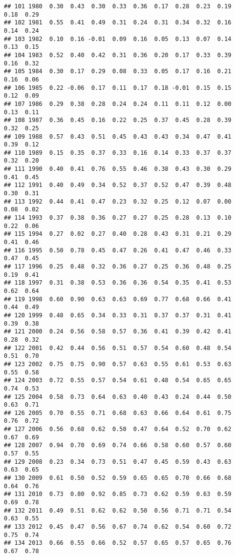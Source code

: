 \documentclass[]{article}
\begin{document}
\begin{verbatim}
## 101 1980  0.30  0.43  0.30  0.33  0.36  0.17  0.28  0.23  0.19  0.18  0.29
## 102 1981  0.55  0.41  0.49  0.31  0.24  0.31  0.34  0.32  0.16  0.14  0.24
## 103 1982  0.10  0.16 -0.01  0.09  0.16  0.05  0.13  0.07  0.14  0.13  0.15
## 104 1983  0.52  0.40  0.42  0.31  0.36  0.20  0.17  0.33  0.39  0.16  0.32
## 105 1984  0.30  0.17  0.29  0.08  0.33  0.05  0.17  0.16  0.21  0.16  0.06
## 106 1985  0.22 -0.06  0.17  0.11  0.17  0.18 -0.01  0.15  0.15  0.12  0.09
## 107 1986  0.29  0.38  0.28  0.24  0.24  0.11  0.11  0.12  0.00  0.13  0.11
## 108 1987  0.36  0.45  0.16  0.22  0.25  0.37  0.45  0.28  0.39  0.32  0.25
## 109 1988  0.57  0.43  0.51  0.45  0.43  0.43  0.34  0.47  0.41  0.39  0.12
## 110 1989  0.15  0.35  0.37  0.33  0.16  0.14  0.33  0.37  0.37  0.32  0.20
## 111 1990  0.40  0.41  0.76  0.55  0.46  0.38  0.43  0.30  0.29  0.41  0.45
## 112 1991  0.40  0.49  0.34  0.52  0.37  0.52  0.47  0.39  0.48  0.30  0.31
## 113 1992  0.44  0.41  0.47  0.23  0.32  0.25  0.12  0.07  0.00  0.08  0.02
## 114 1993  0.37  0.38  0.36  0.27  0.27  0.25  0.28  0.13  0.10  0.22  0.06
## 115 1994  0.27  0.02  0.27  0.40  0.28  0.43  0.31  0.21  0.29  0.41  0.46
## 116 1995  0.50  0.78  0.45  0.47  0.26  0.41  0.47  0.46  0.33  0.47  0.45
## 117 1996  0.25  0.48  0.32  0.36  0.27  0.25  0.36  0.48  0.25  0.19  0.41
## 118 1997  0.31  0.38  0.53  0.36  0.36  0.54  0.35  0.41  0.53  0.62  0.64
## 119 1998  0.60  0.90  0.63  0.63  0.69  0.77  0.68  0.66  0.41  0.44  0.49
## 120 1999  0.48  0.65  0.34  0.33  0.31  0.37  0.37  0.31  0.41  0.39  0.38
## 121 2000  0.24  0.56  0.58  0.57  0.36  0.41  0.39  0.42  0.41  0.28  0.32
## 122 2001  0.42  0.44  0.56  0.51  0.57  0.54  0.60  0.48  0.54  0.51  0.70
## 123 2002  0.75  0.75  0.90  0.57  0.63  0.55  0.61  0.53  0.63  0.55  0.58
## 124 2003  0.72  0.55  0.57  0.54  0.61  0.48  0.54  0.65  0.65  0.74  0.53
## 125 2004  0.58  0.73  0.64  0.63  0.40  0.43  0.24  0.44  0.50  0.63  0.71
## 126 2005  0.70  0.55  0.71  0.68  0.63  0.66  0.64  0.61  0.75  0.76  0.72
## 127 2006  0.56  0.68  0.62  0.50  0.47  0.64  0.52  0.70  0.62  0.67  0.69
## 128 2007  0.94  0.70  0.69  0.74  0.66  0.58  0.60  0.57  0.60  0.57  0.55
## 129 2008  0.23  0.34  0.73  0.51  0.47  0.45  0.59  0.43  0.63  0.63  0.65
## 130 2009  0.61  0.50  0.52  0.59  0.65  0.65  0.70  0.66  0.68  0.64  0.76
## 131 2010  0.73  0.80  0.92  0.85  0.73  0.62  0.59  0.63  0.59  0.69  0.78
## 132 2011  0.49  0.51  0.62  0.62  0.50  0.56  0.71  0.71  0.54  0.63  0.55
## 133 2012  0.45  0.47  0.56  0.67  0.74  0.62  0.54  0.60  0.72  0.75  0.74
## 134 2013  0.66  0.55  0.66  0.52  0.57  0.65  0.57  0.65  0.76  0.67  0.78

\end{verbatim}
\end{document}
